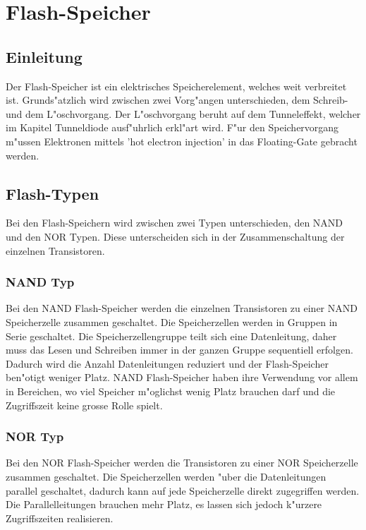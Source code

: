 \chapter{Flash-Speicher\label{chapter:flash}}
\begin{refsection}

\section{Einleitung}
Der Flash-Speicher ist ein elektrisches Speicherelement, welches
weit verbreitet ist. Grunds"atzlich wird zwischen zwei Vorg"angen
unterschieden, dem Schreib- und dem L"oschvorgang. Der L"oschvorgang
beruht auf dem Tunneleffekt, welcher im Kapitel Tunneldiode ausf"uhrlich
erkl"art wird. F"ur den Speichervorgang m"ussen Elektronen mittels
'hot electron injection' in das Floating-Gate gebracht werden.

\section{Flash-Typen}
Bei den Flash-Speichern wird zwischen zwei Typen unterschieden, den NAND
und den NOR Typen. Diese unterscheiden sich in der Zusammenschaltung
der einzelnen Transistoren.

\subsection{NAND Typ}
Bei den NAND Flash-Speicher werden die einzelnen Transistoren zu einer
NAND Speicherzelle zusammen geschaltet. Die Speicherzellen werden in
Gruppen in Serie geschaltet. Die Speicherzellengruppe teilt sich eine
Datenleitung, daher muss das Lesen und Schreiben immer in der ganzen
Gruppe sequentiell erfolgen. Dadurch wird die Anzahl Datenleitungen
reduziert und der Flash-Speicher ben"otigt weniger Platz. NAND
Flash-Speicher haben ihre Verwendung vor allem in Bereichen, wo viel
Speicher m"oglichst wenig Platz brauchen darf und die Zugriffszeit keine
grosse Rolle spielt.
\subsection{NOR Typ}
Bei den NOR Flash-Speicher werden die Transistoren zu einer NOR
Speicherzelle zusammen geschaltet.
Die Speicherzellen werden "uber die Datenleitungen parallel geschaltet,
dadurch kann auf jede Speicherzelle direkt zugegriffen werden. Die
Parallelleitungen brauchen mehr Platz, es lassen sich jedoch k"urzere
Zugriffszeiten realisieren.


\end{refsection}
